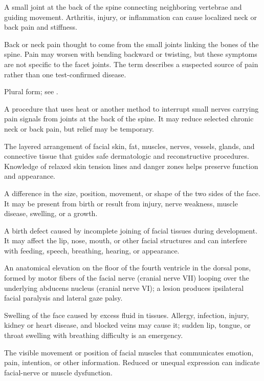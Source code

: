  A small joint at the back of the spine connecting neighboring vertebrae and guiding movement. Arthritis, injury, or inflammation can cause localized neck or back pain and stiffness.

 Back or neck pain thought to come from
  the small joints linking the bones of the spine. Pain may worsen with
  bending backward or twisting, but these symptoms are not specific to
  the facet joints. The term describes a suspected source of pain rather
  than one test-confirmed disease.

 Plural form; see .

 A procedure that uses heat or another method to interrupt small nerves carrying pain signals from joints at the back of the spine. It may reduce selected chronic neck or back pain, but relief may be temporary.

 The layered arrangement of facial skin, fat, muscles, nerves, vessels, glands, and connective tissue that guides safe dermatologic and reconstructive procedures. Knowledge of relaxed skin tension lines and danger zones helps preserve function and appearance.

 A difference in the size, position, movement, or shape of the two sides of the face. It may be present from birth or result from injury, nerve weakness, muscle disease, swelling, or a growth.

 A birth defect caused by incomplete joining of facial tissues during development. It may affect the lip, nose, mouth, or other facial structures and can interfere with feeding, speech, breathing, hearing, or appearance.

 An anatomical elevation on the floor of the fourth ventricle in the dorsal pons, formed by motor fibers of the facial nerve (cranial nerve VII) looping over the underlying abducens nucleus (cranial nerve VI); a lesion produces ipsilateral facial paralysis and lateral gaze palsy.

 Swelling of the face caused by excess fluid in tissues. Allergy, infection, injury, kidney or heart disease, and blocked veins may cause it; sudden lip, tongue, or throat swelling with breathing difficulty is an emergency.

 The visible movement or position of facial muscles that communicates emotion, pain, intention, or other information. Reduced or unequal expression can indicate facial-nerve or muscle dysfunction.

